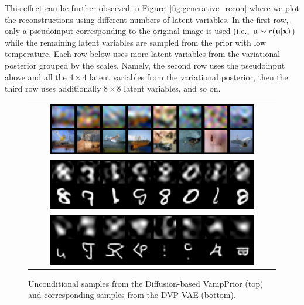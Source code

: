 This effect can be further observed in Figure~\ref{fig:generative_recon} where we plot the reconstructions using different numbers of latent variables. In the first row, only a pseudoinput corresponding to the original image is used (i.e., ${\mathbf{u}} \sim r({\mathbf{u}}|{\mathbf{x}})$) while the remaining latent variables are sampled from the prior with low temperature. Each row below uses more latent variables from the variational posterior grouped by the scales. 
Namely, the second row uses the pseudoinput above and all the $4\times4$ latent variables from the variational posterior, then the third row uses additionally $8\times8$ latent variables, and so on. 

 \begin{figure}[t]
    \begin{tabular}{c}
        \includegraphics[width=0.85\textwidth]{pics/5_dvp/cifar10_dct_prior_samples.pdf} \\
        \includegraphics[width=0.85\textwidth]{pics/5_dvp/mnist_dct_prior_samples.pdf} \\
        \includegraphics[width=0.85\textwidth]{pics/5_dvp/omniglot_dct_prior_samples.pdf} \\
    \end{tabular}
    \caption{Unconditional samples from the Diffusion-based VampPrior (top) and corresponding samples from the DVP-VAE (bottom).}
    \vskip -5pt
    \label{fig:dct_samples}
\end{figure}

